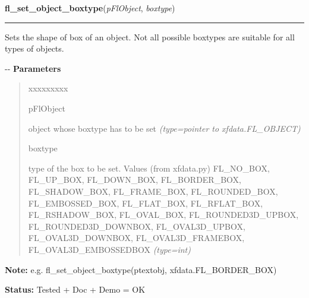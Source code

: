 \hspace{.8\funcindent}\begin{boxedminipage}{\funcwidth}

    \raggedright \textbf{fl\_set\_object\_boxtype}(\textit{pFlObject}, \textit{boxtype})

    \vspace{-1.5ex}

    \rule{\textwidth}{0.5\fboxrule}
\setlength{\parskip}{2ex}

Sets the shape of box of an object. Not all possible boxtypes are
suitable for all types of objects.

-{}-
\setlength{\parskip}{1ex}
      \textbf{Parameters}
      \vspace{-1ex}

      \begin{quote}
        \begin{Ventry}{xxxxxxxxx}

          \item[pFlObject]


object whose boxtype has to be set
            {\it (type=pointer to xfdata.FL\_OBJECT)}

          \item[boxtype]


type of the box to be set. Values (from xfdata.py) FL\_NO\_BOX,
FL\_UP\_BOX, FL\_DOWN\_BOX, FL\_BORDER\_BOX, FL\_SHADOW\_BOX, FL\_FRAME\_BOX,
FL\_ROUNDED\_BOX, FL\_EMBOSSED\_BOX, FL\_FLAT\_BOX, FL\_RFLAT\_BOX,
FL\_RSHADOW\_BOX, FL\_OVAL\_BOX, FL\_ROUNDED3D\_UPBOX, FL\_ROUNDED3D\_DOWNBOX,
FL\_OVAL3D\_UPBOX, FL\_OVAL3D\_DOWNBOX, FL\_OVAL3D\_FRAMEBOX,
FL\_OVAL3D\_EMBOSSEDBOX
            {\it (type=int)}

        \end{Ventry}

      \end{quote}

\textbf{Note:} 
e.g. fl\_set\_object\_boxtype(ptextobj, xfdata.FL\_BORDER\_BOX)


\textbf{Status:} 
Tested + Doc + Demo = OK


    \end{boxedminipage}

    \label{xformslib:flbasic:fl_get_object_boxtype}

    \vspace{0.5ex}

